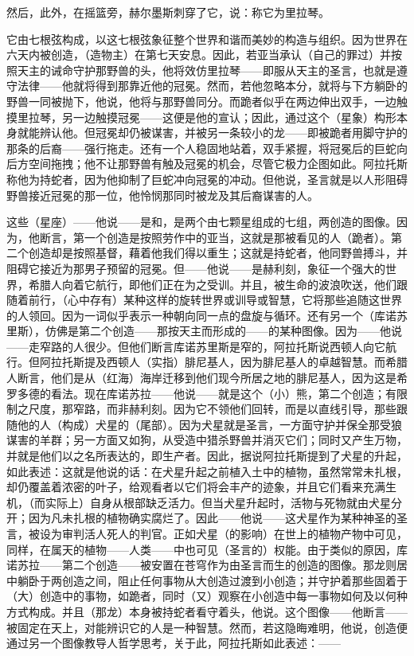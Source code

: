 然后，此外，在摇篮旁，\newline{}赫尔墨斯刺穿了它，说：称它为里拉琴。\par

它由七根弦构成，以这七根弦象征整个世界和谐而美妙的构造与组织。因为世界在六天内被创造，（造物主）在第七天安息。因此，若亚当承认（自己的罪过）并按照天主的诫命守护那野兽的头，他将效仿里拉琴——即服从天主的圣言，也就是遵守法律——他就将得到那靠近他的冠冕。然而，若他忽略本分，就将与下方躺卧的野兽一同被抛下，他说，他将与那野兽同分。而跪者似乎在两边伸出双手，一边触摸里拉琴，另一边触摸冠冕——这便是他的宣认；因此，通过这个（星象）构形本身就能辨认他。但冠冕却仍被谋害，并被另一条较小的龙——即被跪者用脚守护的那条的后裔——强行拖走。还有一个人稳固地站着，双手紧握，将冠冕后的巨蛇向后方空间拖拽；他不让那野兽有触及冠冕的机会，尽管它极力企图如此。阿拉托斯称他为持蛇者，因为他抑制了巨蛇冲向冠冕的冲动。但他说，圣言就是以人形阻碍野兽接近冠冕的那一位，他怜悯那同时被龙及其后裔谋害的人。\par

这些（星座）——他说——是和，是两个由七颗星组成的七组，两创造的图像。因为，他断言，第一个创造是按照劳作中的亚当，这就是那被看见的人（跪者）。第二个创造却是按照基督，藉着他我们得以重生；这就是持蛇者，他同野兽搏斗，并阻碍它接近为那男子预留的冠冕。但——他说——是赫利刻，象征一个强大的世界，希腊人向着它航行，即他们正在为之受训。并且，被生命的波浪吹送，他们跟随着前行，（心中存有）某种这样的旋转世界或训导或智慧，它将那些追随这世界的人领回。因为一词似乎表示一种朝向同一点的盘旋与循环。还有另一个（库诺苏里斯），仿佛是第二个创造——那按天主而形成的——的某种图像。因为——他说——走窄路的人很少。但他们断言库诺苏里斯是窄的，阿拉托斯说西顿人向它航行。但阿拉托斯提及西顿人（实指）腓尼基人，因为腓尼基人的卓越智慧。而希腊人断言，他们是从（红海）海岸迁移到他们现今所居之地的腓尼基人，因为这是希罗多德的看法。现在库诺苏拉——他说——就是这个（小）熊，第二个创造；有限制之尺度，那窄路，而非赫利刻。因为它不领他们回转，而是以直线引导，那些跟随他的人（构成）犬星的（尾部）。因为犬星就是圣言，一方面守护并保全那受狼谋害的羊群；另一方面又如狗，从受造中猎杀野兽并消灭它们；同时又产生万物，并就是他们以之名所表达的，即生产者。因此，据说阿拉托斯提到了犬星的升起，如此表述：这就是他说的话：在犬星升起之前植入土中的植物，虽然常常未扎根，却仍覆盖着浓密的叶子，给观看者以它们将会丰产的迹象，并且它们看来充满生机，（而实际上）自身从根部缺乏活力。但当犬星升起时，活物与死物就由犬星分开；因为凡未扎根的植物确实腐烂了。因此——他说——这犬星作为某种神圣的圣言，被设为审判活人死人的判官。正如犬星（的影响）在世上的植物产物中可见，同样，在属天的植物——人类——中也可见（圣言的）权能。由于类似的原因，库诺苏拉——第二个创造——被安置在苍穹作为由圣言而生的创造的图像。那龙则居中躺卧于两创造之间，阻止任何事物从大创造过渡到小创造；并守护着那些固着于（大）创造中的事物，如跪者，同时（又）观察在小创造中每一事物如何及以何种方式构成。并且（那龙）本身被持蛇者看守着头，他说。这个图像——他断言——被固定在天上，对能辨识它的人是一种智慧。然而，若这隐晦难明，他说，创造便通过另一个图像教导人哲学思考，关于此，阿拉托斯如此表述：——\par

